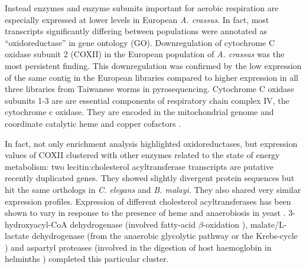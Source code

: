 Instead enzymes and enzyme subunits important for aerobic respiration
are especially expressed at lower levels in European
\textit{A. crassus}. In fact, most transcripts significantly differing
between populations were annotated as ``oxidoreductase'' in gene
ontology (GO).
Downregulation of cytochrome C oxidase subunit 2 (COXII) in the
European population of \textit{A. crassus} was the most persistent
finding. This downregulation was confirmed by the low expression of
the same contig in the European libraries compared to higher
expression in all three libraries from Taiwanese worms in
pyrosequencing. Cytochrome C oxidase subunits 1-3 are are essential
components of respiratory chain complex IV, the cytochrome c
oxidase. They are encoded in the mitochondrial genome and coordinate
catalytic heme and copper cofactors \cite{pmid18023115}.

In fact, not only enrichment analysis highlighted oxidoreductases, but
expression values of COXII clustered with other enzymes related to the
state of energy metabolism: two lecitin:cholesterol acyltransferase
transcripts are putative recently duplicated genes. They showed
slightly divergent protein sequences but hit the same orthologs in
\textit{C. elegans} and \textit{B. malayi}. They also shared very
similar expression profiles. Expression of different cholesterol
acyltransferases has been shown to vary in response to the presence of
heme and anaerobiosis in yeast \cite{pmid11786267}. 3-hydroxyacyl-CoA
dehydrogenase (involved fatty-acid $\beta$-oxidation
\cite{pmid8454629}), malate/L-lactate dehydrogenase (from the
anaerobic glycolytic pathway or the Krebs-cycle
\cite{sturm1969vergleichende}) and aspartyl proteases (involved in the
digestion of host haemoglobin in helminths \cite{pmid12782060})
completed this particular cluster.

